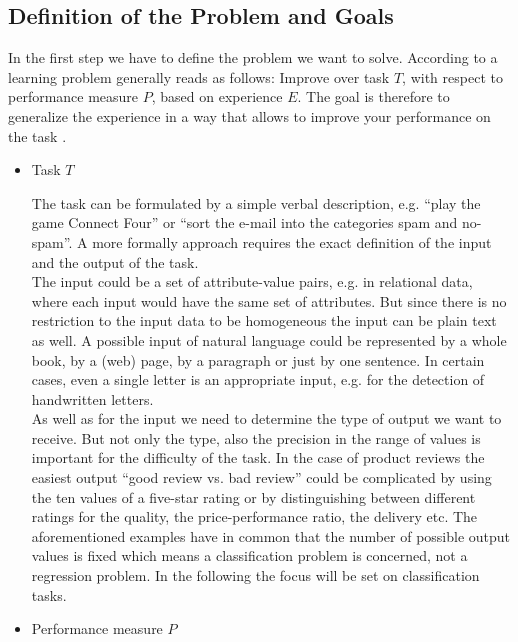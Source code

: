\documentclass[article,type=msc,colorback,accentcolor=tud7b]{tudthesis}
\begin{document}
  \subsection{Definition of the Problem and Goals}
  \label{subsec:definition_of_the_problem_and_goals}
    In the first step we have to define the problem we want to solve. According to \citeauthor{Mitchell1997} a learning problem generally reads as follows: Improve over task $T$, with respect to performance measure $P$, based on experience $E$. The goal is therefore to generalize the experience in a way that allows to improve your performance on the task \autocite[Chapter~1]{Mitchell1997}.
    \begin{itemize}
      \item Task $T$
      
        The task can be formulated by a simple verbal description, e.g. “play the game Connect Four” or “sort the e-mail into the categories spam and no-spam”. A more formally approach requires the exact definition of the input and the output of the task. \\
        The input could be a set of attribute-value pairs, e.g. in relational data, where each input would have the same set of attributes. But since there is no restriction to the input data to be homogeneous the input can be plain text as well. A possible input of natural language could be represented by a whole book, by a (web) page, by a paragraph or just by one sentence. In certain cases, even a single letter is an appropriate input, e.g. for the detection of handwritten letters. \\
        As well as for the input we need to determine the type of output we want to receive. But not only the type, also the precision in the range of values is important for the difficulty of the task. In the case of product reviews the easiest output “good review vs. bad review” could be complicated by using the ten values of a five-star rating or by distinguishing between different ratings for the quality, the price-performance ratio, the delivery etc. The aforementioned examples have in common that the number of possible output values is fixed which means a classification problem is concerned, not a regression problem. In the following the focus will be set on classification tasks.
      \item Performance measure $P$
      

\end{itemize}
\end{document}
